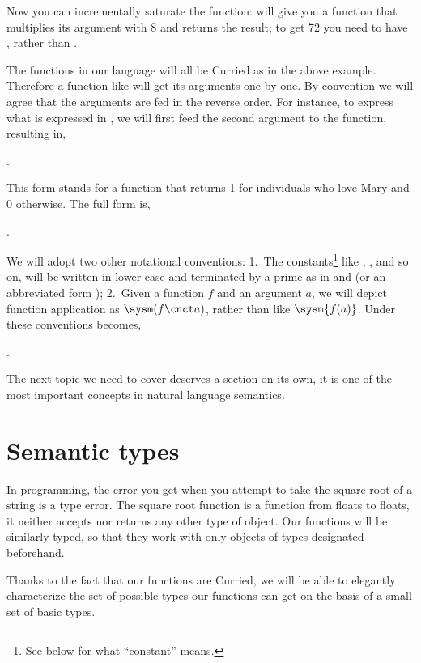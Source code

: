 \documentclass[11pt,a4paper]{article}
\begin{document}
Now you can incrementally saturate the function:  will give you a function that multiplies its argument with 8 and returns the result; to get 72 you need to have , rather than .

The functions in our language will all be Curried as in the above example. Therefore a function like  will get its arguments one by one. By convention we will agree that the arguments are fed in the reverse order. For instance, to express what is expressed in , we will first feed the second argument to the function, resulting in,

\ex.\label{lovesmary} 


This form stands for a function that returns 1 for individuals who love Mary and 0 otherwise. The full form is,


\ex.\label{lovesmaryjohn} 


We will adopt two other notational conventions: 1.\ The constants\footnote{See below for what ``constant'' means.} like , , and so on, will be written in lower case and terminated by a prime as in  and  (or an abbreviated form ); 2.\ Given a function $f$ and an argument $a$, we will depict function application as $\sysm(f\cnct a)$, rather than like $\sysm{f(a)}$. Under these conventions   becomes,

\ex. 

The next topic we need to cover deserves a section on its own, it is one of the most important concepts in natural language semantics.

\section{Semantic types}
	
In programming, the error you get when you attempt to take the square root of a string is a type error. The square root function is a function from floats to floats, it neither accepts nor returns any other type of object.  Our functions will be similarly typed, so that they work with only objects of types designated beforehand.


Thanks to the fact that our functions are Curried, we will be able to elegantly characterize the set of possible types our functions can get on the basis of a small set of basic types.
\end{document}
